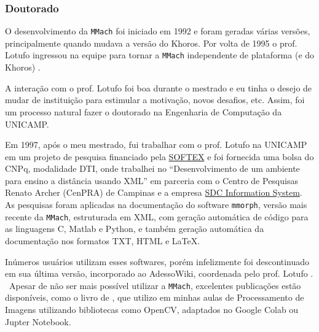 \subsubsection{Doutorado}

O desenvolvimento da \texttt{MMach} foi iniciado em 1992 e foram geradas várias versões, principalmente quando mudava a versão do Khoros. Por volta de 1995 o prof. Lotufo ingressou na equipe para tornar a \texttt{MMach} independente de plataforma (e do Khoros) \cite{lotufo1997MMachLib}. 

A interação com o prof. Lotufo foi boa durante o mestrado e eu tinha o desejo de mudar de instituição para estimular a motivação, novos desafios, etc. Assim, foi um processo natural fazer o doutorado na Engenharia de Computação da UNICAMP. 

Em 1997, após o meu mestrado, fui trabalhar com o prof. Lotufo na UNICAMP em um projeto de pesquisa financiado pela \href{https://softexcps.org.br/}{SOFTEX} e foi fornecida uma bolsa do CNPq, modalidade DTI, onde trabalhei no ``Desenvolvimento de um ambiente para ensino a distância usando XML'' em parceria com o Centro de Pesquisas Renato Archer (CenPRA) de Campinas e a empresa \href{https://sdc.com.br/}{SDC Information System}. As pesquisas foram aplicadas na documentação do software \texttt{mmorph}, versão mais recente da \texttt{MMach}, estruturada em XML, com geração automática de código para as linguagens C, Matlab e Python, e também geração automática da documentação nos formatos TXT, HTML e \LaTeX.

Inúmeros usuários utilizam esses softwares, porém infelizmente foi descontinuado em sua última versão, incorporado ao AdessoWiki, coordenada pelo prof. Lotufo \cite{machado2011adessowiki,rittner2011adessowiki}.
\
Apesar de não ser mais possível utilizar a \texttt{MMach}, excelentes publicações estão disponíveis, como o livro de , que utilizo em minhas aulas de Processamento de Imagens utilizando bibliotecas como OpenCV, adaptados no Google Colab ou Jupter Notebook.

